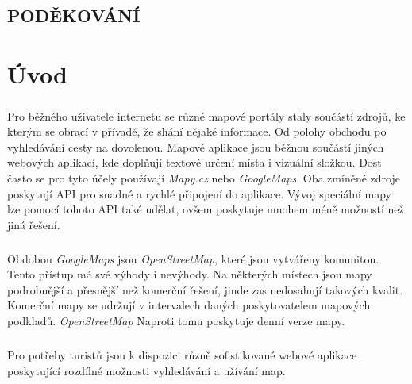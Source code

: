 \documentclass[11pt,a4paper,titlepage,oneside]{book}
\begin{document}
\newpage %
	\vspace*{15cm}
	\section*{\Large PODĚKOVÁNÍ}
	\paragraph{}
		
\renewcommand{\baselinestretch}{1.5} %
\newpage %
\pagestyle{plain}
\setcounter{page}{5}

	\tableofcontents

\newpage %
	\listoffigures
	\listoftables


\newpage %
\chapter*{Úvod}
	\paragraph{} Pro běžného uživatele internetu se různé mapové portály staly součástí zdrojů, ke kterým se obrací v přívadě, že shání nějaké informace. Od polohy obchodu po vyhledávání cesty na dovolenou. Mapové aplikace jsou běžnou součástí jiných webových aplikací, kde doplňují textové určení místa i vizuální složkou. Dost často se pro tyto účely používají \textit{Mapy.cz} nebo \textit{GoogleMaps}. Oba zmíněné zdroje poskytují API pro snadné a rychlé připojení do aplikace. Vývoj speciální mapy lze pomocí tohoto API také udělat, ovšem poskytuje mnohem méně možností než jiná řešení. 
	\paragraph{}Obdobou \textit{GoogleMaps} jsou \textit{OpenStreetMap}, které jsou vytvářeny komunitou. Tento přístup má své výhody i nevýhody. Na některých místech jsou mapy podrobnější a přesnější než komerční řešení, jinde zas nedosahují takových kvalit. Komerční mapy se udržují v intervalech daných poskytovatelem mapových podkladů. \textit{OpenStreetMap} Naproti tomu poskytuje denní verze mapy.
	\paragraph{} Pro potřeby turistů jsou k dispozici různě sofistikované webové aplikace poskytující rozdílné možnosti vyhledávání a užívání map.
\end{document}
